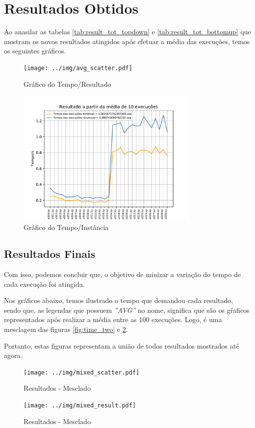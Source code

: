 \documentclass[a4paper, 12pt]{article}
\begin{document}
\section{Resultados Obtidos}
Ao anasilar as tabelas \ref{tab:result_tot_topdown} e \ref{tab:result_tot_bottomup} que mostram 
os novos resultados atingidos após efetuar a média das execuções, temos os seguintes gráficos.

\begin{figure}[!htb]
    \centering
    \texttt{[image: ../img/avg\_scatter.pdf]}
    \caption{Gráfico do Tempo/Resultado}
    \label{fig:avg_scatter}
\end{figure}
\begin{figure}[!htb]
    \centering
    \includegraphics[width=0.8\textwidth]{../img/avg_result.pdf}
    \caption{Gráfico do Tempo/Instância}
    \label{fig:avg_result}
\end{figure}
\clearpage

\subsection{Resultados Finais}
Com isso, podemos concluir que, o objetivo de minizar a variação do tempo de cada execução foi atingida.

Nos gráficos abaixo, temos ilustrado o tempo que demandou cada resultado, sendo que, as legendas que possuem
{\it ''AVG''} no nome, significa que são os gŕaficos representados após realizar a média entre as 100 execuções.
Logo, é uma mesclagem das figuras \ref{fig:time_two} e \ref{fig:avg_result}.

Portanto, estas figuras representam a união de todos resultados mostrados até agora.

\begin{figure}[!htb]
    \centering
    \begin{minipage}{0.55\textwidth}
        \centering
        \texttt{[image: ../img/mixed\_scatter.pdf]}
        \caption{Resultados - Mesclado}
        \label{fig:mixed_result}   
    \end{minipage}%
    \begin{minipage}{0.6\textwidth}
        \centering
        \texttt{[image: ../img/mixed\_result.pdf]}
        \caption{Resultados - Mesclado}
        \label{fig:mixed_scatter}
    \end{minipage}
\end{figure}
\end{document}
